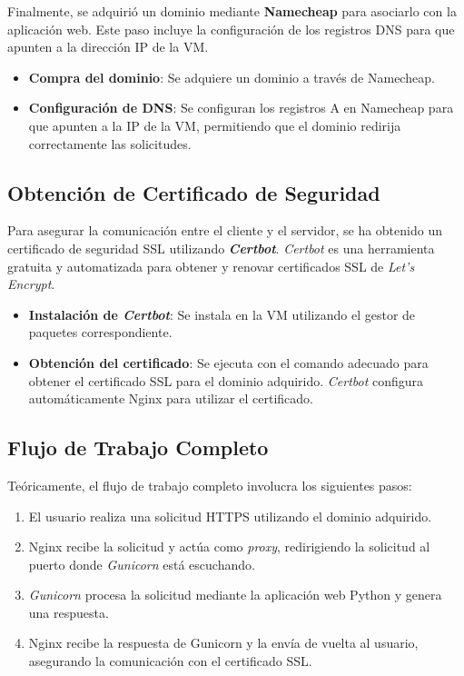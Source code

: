 Finalmente, se adquirió un dominio mediante \textbf{Namecheap} para asociarlo con la aplicación web. Este paso incluye la configuración de los registros DNS para que apunten a la dirección IP de la VM.

\begin{itemize}
	\item \textbf{Compra del dominio}: Se adquiere un dominio a través de Namecheap.
	\item \textbf{Configuración de DNS}: Se configuran los registros A en Namecheap para que apunten a la IP de la VM, permitiendo que el dominio redirija correctamente las solicitudes.
\end{itemize}

\subsection{Obtención de Certificado de Seguridad}

Para asegurar la comunicación entre el cliente y el servidor, se ha obtenido un certificado de seguridad SSL utilizando \textbf{\textit{Certbot}}. \textit{Certbot} es una herramienta gratuita y automatizada para obtener y renovar certificados SSL de \textit{Let's Encrypt}.

\begin{itemize}
	\item \textbf{Instalación de \textit{Certbot}}: Se instala en la VM utilizando el gestor de paquetes correspondiente.
	\item \textbf{Obtención del certificado}: Se ejecuta con el comando adecuado para obtener el certificado SSL para el dominio adquirido. \textit{Certbot} configura automáticamente Nginx para utilizar el certificado.
\end{itemize}


\subsection{Flujo de Trabajo Completo}

Teóricamente, el flujo de trabajo completo involucra los siguientes pasos:

\begin{enumerate}
	\item El usuario realiza una solicitud HTTPS utilizando el dominio adquirido.
	\item Nginx recibe la solicitud y actúa como \textit{proxy}, redirigiendo la solicitud al puerto donde \textit{Gunicorn} está escuchando.
	\item \textit{Gunicorn} procesa la solicitud mediante la aplicación web Python y genera una respuesta.
	\item Nginx recibe la respuesta de Gunicorn y la envía de vuelta al usuario, asegurando la comunicación con el certificado SSL.
\end{enumerate}

